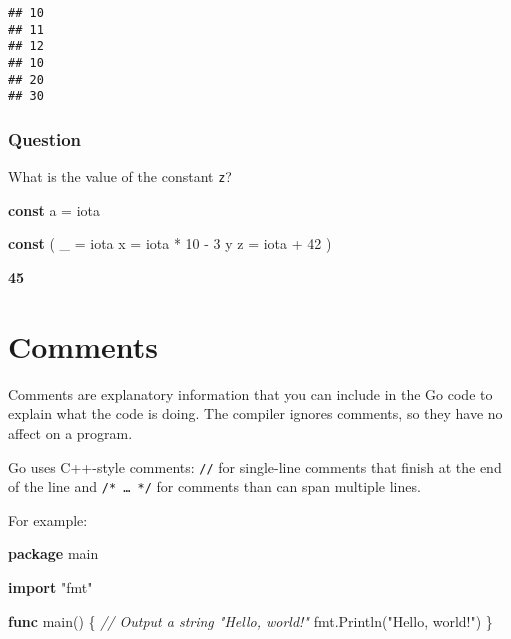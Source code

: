 \documentclass[]{book}
\newenvironment{Shaded}{\begin{snugshade}}{\end{snugshade}}
\newcommand{\CommentTok}[1]{\textcolor[rgb]{0.56,0.35,0.01}{\textit{#1}}}
\newcommand{\DecValTok}[1]{\textcolor[rgb]{0.00,0.00,0.81}{#1}}
\newcommand{\KeywordTok}[1]{\textcolor[rgb]{0.13,0.29,0.53}{\textbf{#1}}}
\newcommand{\NormalTok}[1]{#1}
\newcommand{\OtherTok}[1]{\textcolor[rgb]{0.56,0.35,0.01}{#1}}
\newcommand{\StringTok}[1]{\textcolor[rgb]{0.31,0.60,0.02}{#1}}
\begin{document}
\begin{verbatim}
## 10
## 11
## 12
## 10
## 20
## 30
\end{verbatim}

\hypertarget{question-15}{%
\subsubsection*{Question}\label{question-15}}

What is the value of the constant \texttt{z}?

\begin{Shaded}
\begin{Highlighting}[]
\KeywordTok{const}\NormalTok{ a = }\OtherTok{iota}

\KeywordTok{const}\NormalTok{ (}
\NormalTok{    _ = }\OtherTok{iota}
\NormalTok{    x = }\OtherTok{iota}\NormalTok{ * }\DecValTok{10}\NormalTok{ - }\DecValTok{3}
\NormalTok{    y}
\NormalTok{    z = }\OtherTok{iota}\NormalTok{ + }\DecValTok{42}
\NormalTok{)}
\end{Highlighting}
\end{Shaded}

\textbf{45}

\hypertarget{comments}{%
\section{Comments}\label{comments}}

Comments are explanatory information that you can include in the Go code to
explain what the code is doing. The compiler ignores comments, so they have no
affect on a program.

Go uses C++-style comments: \texttt{//} for single-line comments that finish at the
end of the line and \texttt{/*~\ldots{}~*/} for comments than can span multiple lines.

For example:

\begin{Shaded}
\begin{Highlighting}[]
\KeywordTok{package}\NormalTok{ main}

\KeywordTok{import} \StringTok{"fmt"}

\KeywordTok{func}\NormalTok{ main() \{}
    \CommentTok{// Output a string "Hello, world!"}
\NormalTok{    fmt.Println(}\StringTok{"Hello, world!"}\NormalTok{)}
\NormalTok{\}}
\end{Highlighting}
\end{Shaded}
\end{document}
